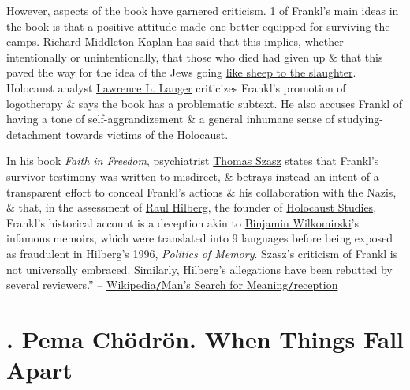 \documentclass[oneside]{book}
\numberwithin{equation}{section}
\begin{document}
However, aspects of the book have garnered criticism. 1 of Frankl's main ideas in the book is that a \href{https://en.wikipedia.org/wiki/Positive_mental_attitude}{positive attitude} made one better equipped for surviving the camps. Richard Middleton-Kaplan has said that this implies, whether intentionally or unintentionally, that those who died had given up \& that this paved the way for the idea of the Jews going \href{https://en.wikipedia.org/wiki/Like_sheep_to_the_slaughter}{like sheep to the slaughter}. Holocaust analyst \href{https://en.wikipedia.org/wiki/Lawrence_L._Langer}{Lawrence L. Langer} criticizes Frankl's promotion of logotherapy \& says the book has a problematic subtext. He also accuses Frankl of having a tone of self-aggrandizement \& a general inhumane sense of studying-detachment towards victims of the Holocaust.

In his book \textit{Faith in Freedom}, psychiatrist \href{https://en.wikipedia.org/wiki/Thomas_Szasz}{Thomas Szasz} states that Frankl's survivor testimony was written to misdirect, \& betrays instead an intent of a transparent effort to conceal Frankl's actions \& his collaboration with the Nazis, \& that, in the assessment of \href{https://en.wikipedia.org/wiki/Raul_Hilberg}{Raul Hilberg}, the founder of \href{https://en.wikipedia.org/wiki/Holocaust_studies}{Holocaust Studies}, Frankl's historical account is a deception akin to \href{https://en.wikipedia.org/wiki/Fragments:_Memories_of_a_Wartime_Childhood}{Binjamin Wilkomirski}'s infamous memoirs, which were translated into 9 languages before being exposed as fraudulent in Hilberg's 1996, \textit{Politics of Memory}. Szasz's criticism of Frankl is not universally embraced. Similarly, Hilberg's allegations have been rebutted by several reviewers.'' -- \href{https://en.wikipedia.org/wiki/Man%27s_Search_for_Meaning#Reception}{Wikipedia\texttt{/}Man's Search for Meaning\texttt{/}reception}


\chapter{\cite{Chodron2002}. Pema Ch\"odr\"on. When Things Fall Apart}
\end{document}
